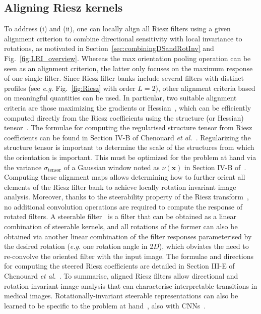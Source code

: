 \documentclass[fleqn,a4paper,oneside,openany]{book}
\begin{document}
\subsection{Aligning Riesz kernels}
To address (i) and (ii), one can locally align all Riesz filters using a given alignment criterion to combine directional sensitivity with local invariance to rotations, as motivated in Section~\ref{sec:combiningDSandRotInv} and Fig.~\ref{fig:LRI_overview}.
Whereas the max orientation pooling operation can be seen as an alignment criterion, the latter only focuses on the maximum response of one single filter.
Since Riesz filter banks include several filters with distinct profiles (see \textit{e.g.} Fig.~\ref{fig:Riesz} with order $L=2$), other alignment criteria based on meaningful quantities can be used.
In particular, two suitable alignment criteria are those maximizing the gradients or Hessian~\cite{DMP2017}, which can be efficiently computed directly from the Riesz coefficients using the structure (or Hessian) tensor~\cite{ChU2012}.
The formulae for computing the regularised structure tensor from Riesz coefficients can be found in Section IV-B of Chenouard \textit{et al.}~\cite{ChU2012}.
Regularizing the structure tensor is important to determine the scale of the structures from which the orientation is important.
This must be optimized for the problem at hand via the variance $\sigma_{\text{tensor}}$ of a Gaussian window noted as $\nu(\boldsymbol{x})$ in Section IV-B of~\cite{ChU2012}.
Computing these alignment maps allows determining how to further orient all elements of the Riesz filter bank to achieve locally rotation invariant image analysis. 
Moreover, thanks to the steerability property of the Riesz transform~\cite{UnV2010}, no additional convolution operations are required to compute the response of rotated filters.
A steerable filter~\cite{FrA1991} is a filter that can be obtained as a linear combination of steerable kernels, and all rotations of the former can also be obtained via another linear combination of the filter responses parameterised by the desired rotation (\textit{e.g.} one rotation angle in 2$D$), which obviates the need to re-convolve the oriented filter with the input image.
The formulae and directions for computing the steered Riesz coefficients are detailed in Section III-E of Chenouard \textit{et al.}~\cite{ChU2012}.
To summarise, aligned Riesz filters allow directional and rotation-invariant image analysis that can characterise interpretable transitions in medical images.
Rotationally-invariant steerable representations can also be learned to be specific to the problem at hand~\cite{Depeursinge2017,AFO2019}, also with CNNs~\cite{AFO2019,AFO2019b,WHS2018,Winkels2019,Weiler2018,bekkers2018roto}.
\end{document}

